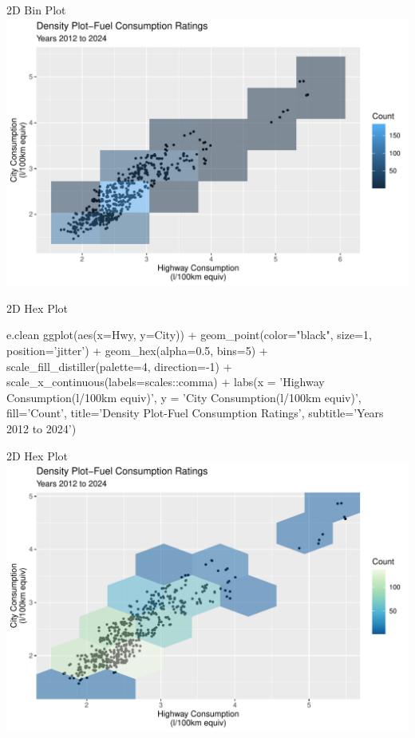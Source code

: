 \documentclass[ignorenonframetext,xcolor=x11names]{beamer}
\begin{document}
\begin{frame}{2D Bin Plot}
  \includegraphics[width=\textwidth]{fuel.bin2d.pdf}
\end{frame}

\begin{frame}[fragile]{2D Hex Plot}
\footnotesize
\begin{Rcode}
e.clean %
  ggplot(aes(x=Hwy, y=City)) + 
    geom_point(color="black", size=1, 
               position='jitter') +
    geom_hex(alpha=0.5, bins=5) + 
    scale_fill_distiller(palette=4, direction=-1) +
    scale_x_continuous(labels=scales::comma) +
    labs(x = 'Highway Consumption\n(l/100km equiv)', 
         y = 'City Consumption\n(l/100km equiv)', 
         fill='Count', 
         title='Density Plot-Fuel Consumption Ratings', 
         subtitle='Years 2012 to 2024') 
\end{Rcode}
\end{frame}

\begin{frame}{2D Hex Plot}
  \includegraphics[width=\textwidth]{fuel.hex2d.pdf}
\end{frame}
\end{document}

